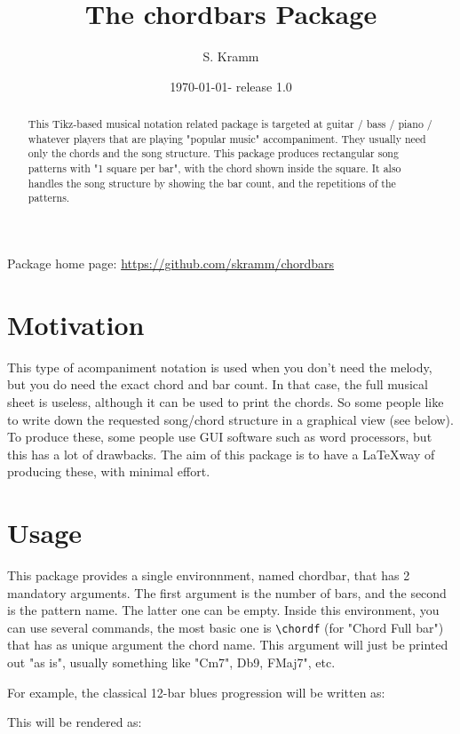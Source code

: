 \documentclass[11pt]{article}
\title{The chordbars Package}
\author{S. Kramm}
\date{\today - release 1.0}
\begin{document}
\maketitle

\begin{abstract}
This Tikz-based musical notation related package is targeted at guitar / bass / piano / whatever players that are playing "popular music" accompaniment.
They usually need only the chords and the song structure.
This package produces rectangular song patterns with "1 square per bar", with the chord shown inside the square.
It also handles the song structure by showing the bar count, and the repetitions of the patterns.
\end{abstract}

Package home page: \url{https://github.com/skramm/chordbars}

\section{Motivation}

This type of acompaniment notation is used when you don't need the melody, but you do need the exact chord and bar count.
In that case, the full musical sheet is useless, although it can be used to print the chords.
So some people like to write down the requested song/chord structure in a graphical view (see below).
To produce these, some people use GUI software such as word processors, but this has a lot of drawbacks.
The aim of this package is to have a \LaTeX way of producing these, with minimal effort.


\section{Usage}
This package provides a single environnment, named {\ttfamily chordbar}, that has 2 mandatory arguments.
The first argument is the number of bars, and the second is the pattern name.
The latter one can be empty.
Inside this environment, you can use several commands, the most basic one is 
\verb|\chordf| (for "Chord Full bar") that has as unique argument the chord name.
This argument will just be printed out "as is", usually something like "Cm7", Db9, FMaj7", etc.

For example, the classical 12-bar blues progression will be written as:




This will be rendered as:
\end{document}
